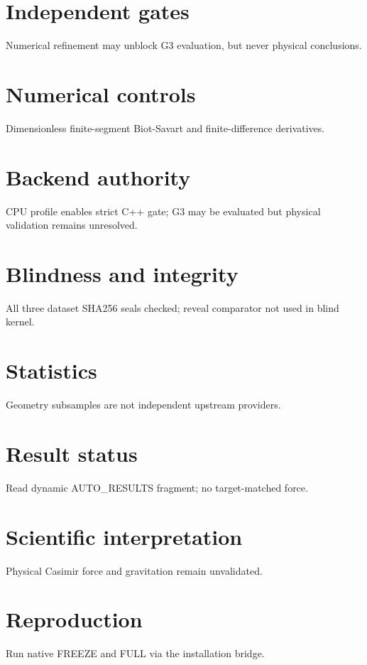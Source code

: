 \documentclass[10pt,a4paper]{article}
\begin{document}
\section{Independent gates}
Numerical refinement may unblock G3 evaluation, but never physical conclusions.
\section{Numerical controls}
Dimensionless finite-segment Biot-Savart and finite-difference derivatives.
\section{Backend authority}
CPU profile enables strict C++ gate; G3 may be evaluated but physical validation remains unresolved.
\section{Blindness and integrity}
All three dataset SHA256 seals checked; reveal comparator not used in blind kernel.
\section{Statistics}
Geometry subsamples are not independent upstream providers.
\section{Result status}
Read dynamic AUTO\_RESULTS fragment; no target-matched force.

\section{Scientific interpretation}
Physical Casimir force and gravitation remain unvalidated.
\section{Reproduction}
Run native FREEZE and FULL via the installation bridge.
\end{document}
